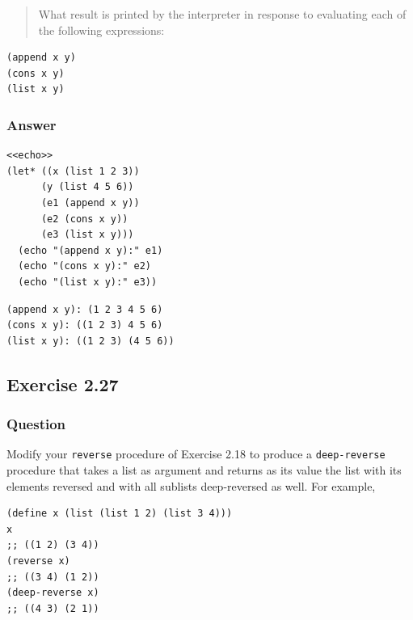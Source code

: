 \documentclass[final,fleqn,titlepage,twoside]{article}
\begin{document}
\begin{quote}
What result is printed by the interpreter in response to evaluating each of the
following expressions:
\end{quote}

\begin{verbatim}
(append x y)
(cons x y)
(list x y)
\end{verbatim}

\subsubsection{Answer}
\label{sec:orgb2d08c9}
\begin{verbatim}
<<echo>>
(let* ((x (list 1 2 3))
      (y (list 4 5 6))
      (e1 (append x y))
      (e2 (cons x y))
      (e3 (list x y)))
  (echo "(append x y):" e1)
  (echo "(cons x y):" e2)
  (echo "(list x y):" e3))
\end{verbatim}

\begin{verbatim}
(append x y): (1 2 3 4 5 6) 
(cons x y): ((1 2 3) 4 5 6) 
(list x y): ((1 2 3) (4 5 6)) 
\end{verbatim}

\subsection{Exercise 2.27}
\label{sec:org62f9a04}
\subsubsection{Question}
\label{sec:org02c5a22}
Modify your \texttt{reverse} procedure of Exercise 2.18 to produce a
\texttt{deep-reverse} procedure that takes a list as argument and returns as
its value the list with its elements reversed and with all sublists
deep-reversed as well. For example,

\begin{verbatim}
(define x (list (list 1 2) (list 3 4)))
x
;; ((1 2) (3 4))
(reverse x)
;; ((3 4) (1 2))
(deep-reverse x)
;; ((4 3) (2 1))
\end{verbatim}
\end{document}
